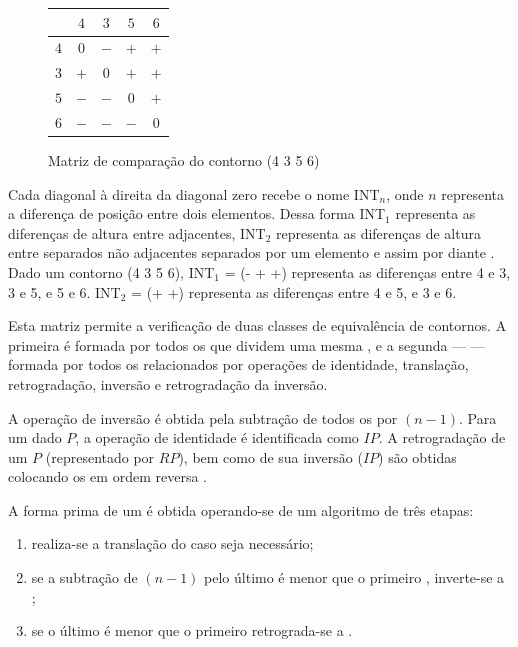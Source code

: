 \begin{figure}
  \centering
  \begin{tabular}{r|cccc}
    & $4$ & $3$ & $5$ & $6$ \\
    \hline
    $4$ & $0$ & $-$ & $+$ & $+$ \\
    $3$ & $+$ & $0$ & $+$ & $+$ \\
    $5$ & $-$ & $-$ & $0$ & $+$ \\
    $6$ & $-$ & $-$ & $-$ & $0$ \\
  \end{tabular}
  \caption{Matriz de comparação do contorno (4 3 5 6)}
  \label{fig:matriz-4356}
\end{figure}

Cada diagonal à direita da diagonal zero recebe o nome INT$_n$, onde
$n$ representa a diferença de posição entre dois elementos. Dessa
forma INT$_1$ representa as diferenças de altura entre 
adjacentes, INT$_2$ representa as diferenças de altura entre
 separados não adjacentes separados por um elemento e
assim por diante \cite[p. 231]{marvin.ea87:relating}. Dado um contorno
(4 3 5 6), INT$_1$ = (- + +) representa as diferenças entre 4 e 3, 3 e
5, e 5 e 6. INT$_2$ = (+ +) representa as diferenças entre 4 e 5, e 3
e 6.

Esta matriz permite a verificação de duas classes de equivalência de
contornos. A primeira é formada por todos os  que dividem uma
mesma , e a segunda ---  --- formada por
todos os  relacionados por operações de identidade,
translação, retrogradação, inversão e retrogradação da inversão.

A operação de inversão é obtida pela subtração de todos os 
por $(n-1)$. Para um dado  $P$, a operação de identidade é
identificada como $IP$. A retrogradação de um  $P$
(representado por $RP$), bem como de sua inversão ($IP$) são obtidas
colocando os  em ordem reversa
\cite[p. 231]{marvin.ea87:relating}.

A forma prima de um  é obtida operando-se de um algoritmo de
três etapas:
\begin{enumerate}
\item realiza-se a translação do  caso seja necessário;
\item se a subtração de $(n-1)$ pelo último  é menor
  que o primeiro , inverte-se a ;
\item se o último  é menor que o primeiro
   retrograda-se a .
\end{enumerate}

